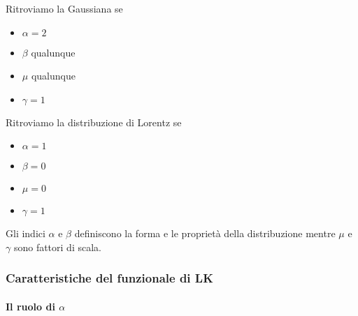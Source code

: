 \begin{exmp}[Gaussiana]
    Ritroviamo la Gaussiana se
    \begin{itemize}
        \item $\alpha =2$ 
	\item $\beta$ qualunque
	\item $\mu$ qualunque
	\item $\gamma  =1$ 
    \end{itemize}
\end{exmp}
\begin{exmp}[Lorentz]
    Ritroviamo la distribuzione di Lorentz se
    \begin{itemize}
        \item $\alpha =1$ 
	\item $\beta  = 0$ 
	\item $\mu  = 0$ 
	\item $\gamma  = 1$ 
    \end{itemize}
\end{exmp}
\noindent
\noindent
Gli indici $\alpha$ e $\beta$ definiscono la forma e le proprietà della distribuzione mentre $\mu$ e $\gamma$ sono fattori di scala.
\subsubsection{Caratteristiche del funzionale di LK}%
\label{subsub:Caratteristiche del funzionale di LK}
\paragraph{Il ruolo di $\alpha$}%
\label{par:Il ruolo di alpha }

